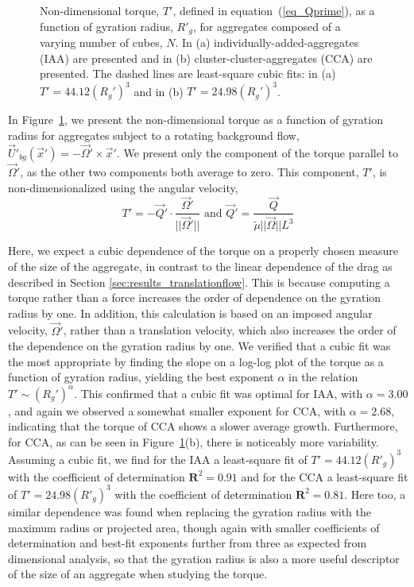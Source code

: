 \begin{figure}[ht]
	\begin{center}
	\end{center}
	\caption{Non-dimensional torque, $T'$, defined in equation~(\ref{eq_Qprime}), as a function of gyration radius, $R'_g$, for aggregates composed of a varying number of cubes, $N$. In (a)  individually-added-aggregates (IAA) are presented and in (b) cluster-cluster-aggregates (CCA) are presented.	The dashed lines are least-square cubic fits: in (a) $T' = 44.12 (R_g')^3$ and in (b) $T' = 24.98 (R_g')^3$.}
	\label{fig_torque}
\end{figure}
In Figure~\ref{fig_torque}, we present the non-dimensional torque as a function of gyration radius for aggregates subject to a rotating background flow, $\vec{U}'_{bg}(\vec{x}') = -\vec{\Omega}' \times \vec{x}'$. We present only the component of the torque parallel to $\vec{\Omega}'$, as the other two components both average to zero. This component, $T'$, is non-dimensionalized using the angular velocity, 
\begin{equation}
T' = -\vec{Q}' \cdot \frac{\vec{\Omega}'}{||\vec{\Omega}' ||}  \text{\ \ \ and \ \ \ } \vec{Q}' = \frac{  \vec{Q} } {\tilde{\mu} ||\vec{\Omega}  || L^3 } 
\label{eq_Qprime}
\end{equation}


Here, we expect a cubic dependence of the torque on a properly chosen measure of the size of the aggregate, 
 in contrast to the linear dependence of the drag as described in Section 
\ref{sec:results_translationflow}. 
This is because computing a torque rather than a force increases the order of dependence on the gyration radius by one. In addition, this calculation is based on an imposed angular velocity, $\vec{\Omega}'$, rather than a translation velocity, which also increases the order of the dependence on the gyration radius by one.
We verified that a cubic fit was the most appropriate by finding the slope on a log-log plot of the torque as a function of gyration radius, yielding the best exponent $\alpha$ in the relation $T' \sim (R_g')^\alpha$. This confirmed that a cubic fit was optimal for IAA, with $\alpha=3.00$, and again we observed a somewhat smaller exponent for CCA, with $\alpha=2.68$, indicating that the torque of CCA shows a slower average growth.  Furthermore, for CCA, as can be seen in Figure~\ref{fig_torque}(b), there is noticeably more variability.
Assuming a cubic fit, we find for the IAA a least-square fit of $T' = 44.12 (R'_g)^3$ with the coefficient of determination $\mathbf{R}^2=0.91$ and for the CCA a least-square fit of $T' = 24.98 (R'_g)^3$ with the coefficient of determination $\mathbf{R}^2=0.81$. Here too, a similar dependence was found when replacing the gyration radius with the maximum radius or projected area, though again with smaller coefficients of determination and best-fit exponents further from three as expected from dimensional analysis, so that the gyration radius is also a more useful descriptor of the size of an aggregate when studying the torque.


